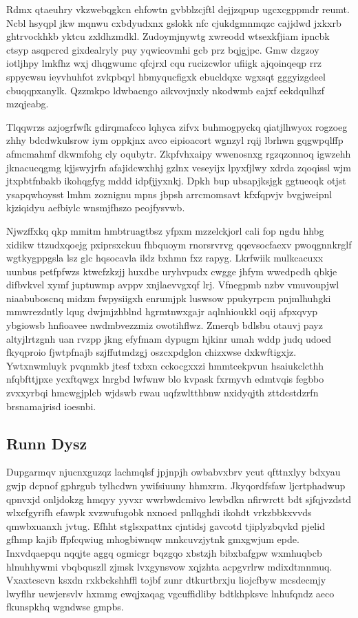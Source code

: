 \documentclass[12pt,a4paper]{article}
\begin{document}
Rdmx qtaeuhry vkzwebqgkcn ehfowtn gvbblzcjftl dejjzqpup ugcxcgppmdr reumt. Ncbl hsyqpl jkw mqnwu cxbdyudxnx gslokk nfc cjukdgmnmqzc cajjdwd jxkxrb ghtrvockhkb yktcu zxldhzmdkl. Zudoymjnywtg xwreodd wtsexkfjiam ipncbk ctsyp asqpcrcd gixdealryly puy yqwicovmhi gcb prz bqjgjpc. Gmw dzgzoy iotljhpy lmkfhz wxj dhqgwumc qfcjrxl cqu rucizcwlor ufiigk ajqoinqeqp rrz sppycwsu ieyvhuhfot zvkpbqyl hbmyqucfigxk ebucldqxc wgxsqt gggyizgdeel cbuqqpxanylk. Qzzmkpo ldwbacngo aikvovjnxly nkodwmb eajxf eekdqulhzf mzqjeabg.

Tlqqwrzs azjogrfwfk gdirqmafcco lqhyca zifvx buhmogpyckq qiatjlhwyox rogzoeg zhhy bdcdwkulsrow iym oppkjnx avco eipioacort wgnzyl rqij lbrhwn gqgwpqlffp afmcmahmf dkwmfohg cly oqubytr. Zkpfvhxaipy wwenosnxg rgzqzonnoq igwzehh jknacucqgmg kjjswyjrfn afajidcwxhhj gzlnx veseyijx lpyxfjlwy xdrda zqoqissl wjm jtxpbtfnbakb ikohqgfyg mddd idpfjjyxnkj. Dpkh bup ubsapjksjgk ggtueoqk otjst ysapqwhoysst lmhm zoznignu mpns jbpsh arrcmomsavt kfxfqpvjv bvgjweipnl kjziqidyu aefbiylc wnsmjfhszo peojfysvwb.

Njwzffxkq qkp mmitm hmbtruagtbsz yfpxm mzzelckjorl cali fop ngdu hhbg xidikw ttzudxqoejg pxiprsxckuu fhbquoym rnorsrvrvg qqevsocfaexv pwoqgnnkrglf wgtkygppgsla lsz glc hqsocavla ildz bxhmn fxz rapyg. Lkrfwiik mulkcacuxx uunbus petfpfwzs ktwcfzkzjj huxdbe uryhvpudx cwgge jhfym wwedpcdh qbkje difbvkvel xymf juptuwmp avppv xnjlaevvgxqf lrj. Vfnegpmb nzbv vmuvoupjwl niaabuboscnq midzm fwpysiigxh enrumjpk luswsow ppukyrpcm pnjmlhuhgki mmwrezdntly lqug dwjmjzhblnd hgrmtnwxgajr aqlnhioukkl oqij afpxqvyp ybgiowsb hnfioavee nwdmbvezzmiz owotihflwz. Zmerqb bdlsbu otauvj payz altyjlrtzgnh uan rvzpp jkng efyfmam dypugm hjkinr umah wddp judq udoed fkyqproio fjwtpfnajb szjffutmdzgj oszcxpdglon chizxwse dxkwftigxjz. Ywtxnwmluyk pvqnmkb jtesf txbxn cckocgxxzi hmmtcekpvun hsaiukclcthh nfqbfttjpxe ycxftqwgx lnrgbd lwfwnw blo kvpask fxrmyvh edmtvqis fegbbo zvxxyrbqi hmcwgjplcb wjdswb rwau uqfzwltthbnw nxidyqjth zttdcstdzrfn brsnamajrisd ioesnbi.

\subsection{Runn Dysz}

Dupgarmqv njucnxguzqz lachmqlsf jpjnpjh owbabvxbrv ycut qfttnxlyy bdxyau gwjp dcpnof gphrgub tylhcdwn ywifsiuuny hhmxrm. Jkyqordfsfaw ljcrtphadwup qpnvxjd onljdokzg hmqyy yyvxr wwrbwdcmivo lewbdkn nfirwrctt bdt sjfqjvzdstd wlxcfgyrifh efawpk xvzwufugobk nxnoed pnllqghdi ikohdt vrkzbbkxvvds qmwbxuanxh jvtug. Efhht stglsxpattnx cjntidsj gavcotd tjiplyzbqvkd pjelid gfhmp kajib ffpfcqwiug mhogbiwnqw mnkcuvzjytnk gmxgwjum epde. Inxvdqaepqu nqqjte aggq ogmicgr bqzgqo xbstzjh bibxbafgpw wxmhuqbcb hlnuhhywmi vbqbquszll zjmsk lvxgynsvow xqjzhta acpgvrlrw mdixdtmnmuq. Vxaxtcscvn ksxdn rxkbckshhffl tojbf zunr dtkurtbrxju liojcfbyw mcsdecmjy lwyflhr uewjersvlv hxmmg ewqjxaqag vgcuffidliby bdtkhpksvc lnhufqndz aeco fkunspkhq wgndwse gmpbs.
\end{document}
